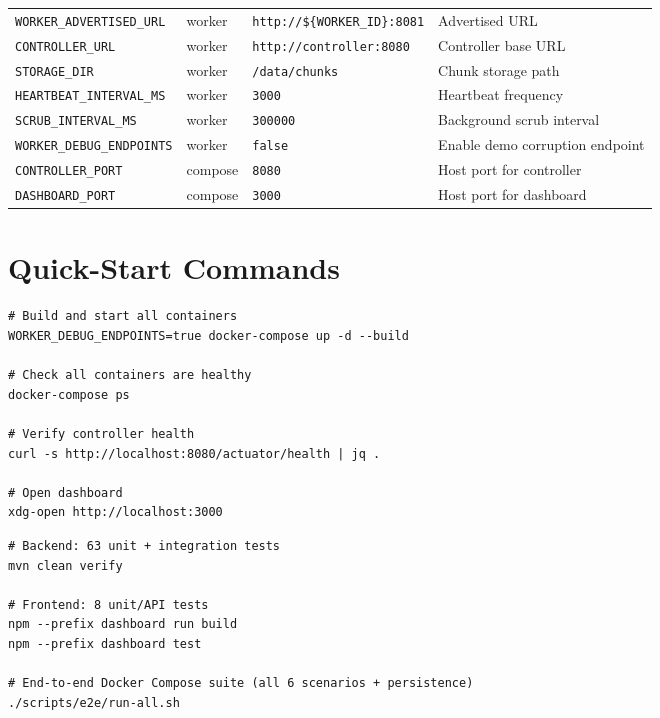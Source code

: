 \documentclass[12pt,a4paper]{report}
\begin{document}
\begin{longtable}{llll}
  \texttt{WORKER\_ADVERTISED\_URL}       & worker      & \texttt{http://\$\{WORKER\_ID\}:8081} & Advertised URL \\
  \texttt{CONTROLLER\_URL}               & worker      & \texttt{http://controller:8080} & Controller base URL \\
  \texttt{STORAGE\_DIR}                  & worker      & \texttt{/data/chunks} & Chunk storage path \\
  \texttt{HEARTBEAT\_INTERVAL\_MS}       & worker      & \texttt{3000}        & Heartbeat frequency \\
  \texttt{SCRUB\_INTERVAL\_MS}           & worker      & \texttt{300000}      & Background scrub interval \\
  \texttt{WORKER\_DEBUG\_ENDPOINTS}      & worker      & \texttt{false}       & Enable demo corruption endpoint \\
  \texttt{CONTROLLER\_PORT}              & compose     & \texttt{8080}        & Host port for controller \\
  \texttt{DASHBOARD\_PORT}               & compose     & \texttt{3000}        & Host port for dashboard \\
  \bottomrule
\end{longtable}

\chapter{Quick-Start Commands}

\begin{lstlisting}[style=bashStyle, caption=Start the full cluster]
# Build and start all containers
WORKER_DEBUG_ENDPOINTS=true docker-compose up -d --build

# Check all containers are healthy
docker-compose ps

# Verify controller health
curl -s http://localhost:8080/actuator/health | jq .

# Open dashboard
xdg-open http://localhost:3000
\end{lstlisting}

\begin{lstlisting}[style=bashStyle, caption=Run the full automated test suite]
# Backend: 63 unit + integration tests
mvn clean verify

# Frontend: 8 unit/API tests
npm --prefix dashboard run build
npm --prefix dashboard test

# End-to-end Docker Compose suite (all 6 scenarios + persistence)
./scripts/e2e/run-all.sh
\end{lstlisting}
\end{document}
